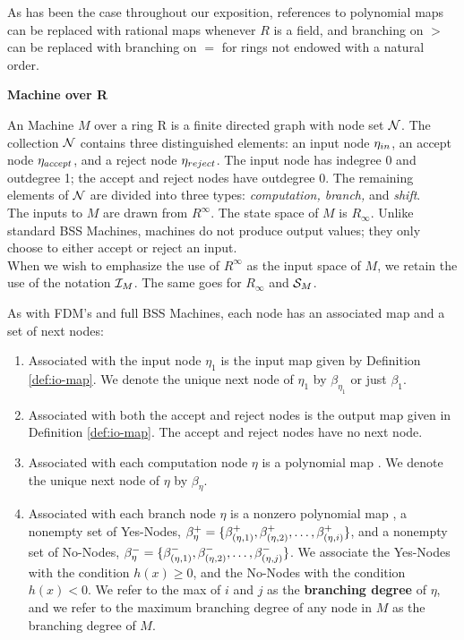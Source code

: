 As has been the case throughout our exposition, references to
polynomial maps can be replaced with rational maps whenever $R$ is a
field, and branching on $>$ can be replaced with branching on $=$ for
rings not endowed with a natural order.

\begin{definition} \textbf{\ndet Machine over R}

  An \ndet Machine $M$ over a ring R is a finite directed graph with
  node set $\mathcal{N}$.  The collection $\mathcal{N}$ contains three
  distinguished elements: an input node $\eta_{in}$, an accept node
  $\eta_{accept}$, and a reject node $\eta_{reject}$.  The input node has indegree
  0 and outdegree 1; the accept and reject nodes have outdegree 0.
  The remaining elements of $\mathcal{N}$ are divided into three types:
  \emph{computation, branch,} and \emph{shift}.\\

  The inputs to $M$ are drawn from $R^\infty$.  The state space of $M$
  is $R_\infty$. Unlike standard BSS Machines, \ndet machines do not
  produce output values; they only choose to either accept or reject
  an input.\\

  When we wish to emphasize the use of $R^\infty$ as the input space
  of $M$, we retain the use of the notation $\mathcal{I}_M$. The same
  goes for $R_\infty$ and $\mathcal{S}_M$.

  As with FDM's and full BSS Machines, each node has an associated map
  and a set of next nodes:

  \begin{enumerate}
  \item Associated with the input node $\eta_1$ is the input map
     given by Definition
    \ref{def:io-map}. We denote the unique next node of $\eta_1$ by
    $\beta_{\eta_1}$ or just $\beta_1$.

  \item Associated with both the accept and reject nodes is the
    output map  given in
    Definition \ref{def:io-map}.  The accept and reject nodes have
    no next node.

  \item Associated with each computation node $\eta$ is a polynomial
    map . We denote the
    unique next node of $\eta$ by $\beta_\eta$.
    
  \item Associated with each branch node $\eta$ is a nonzero
    polynomial map , a
    nonempty set of Yes-Nodes, $\beta^+_\eta = \{\beta_{(\eta, 1)}^+,
      \beta_{(\eta, 2)}^+, \ldots, \beta_{(\eta, i)}^+\}$, and a nonempty set of
    No-Nodes, $\beta_\eta^- = \{\beta_{(\eta, 1)}^-, \beta_{(\eta, 2)}^-, \ldots,
      \beta_{(\eta, j)}^-\}$.  We associate the Yes-Nodes with the condition
    $h(x) \geq 0$, and the No-Nodes with the condition $h(x) < 0$. We
    refer to the max of $i$ and $j$ as the \textbf{branching degree}
    of $\eta$, and we refer to the maximum branching degree of any
    node in $M$ as the branching degree of $M$.


\end{enumerate}
\end{definition}
